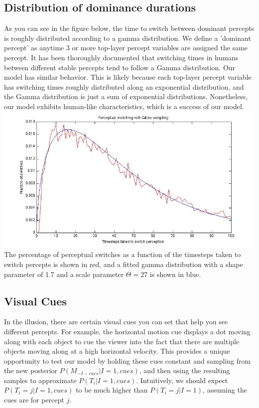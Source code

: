 \documentclass{article} %
\begin{document}


\subsection{Distribution of dominance durations}
As you can see in the figure below, the time to switch between dominant percepts is roughly distributed according to a gamma distribution. We define a 'dominant percept' as anytime 3 or more top-layer percept variables are assigned the same percept. It has been thoroughly documented that switching times in humans between different stable percepts tend to follow a Gamma distribution. Our model has similar behavior. This is likely because each top-layer percept variable has switching times roughly distributed along an exponential distribution, and the Gamma distribution is just a sum of exponential distributions. Nonetheless, our model exhibits human-like characteristics, which is a success of our model. \\

\includegraphics[scale=0.51]{sickbrah}
\small
The percentage of perceptual switches as a function of the timesteps taken to switch percepts is shown in red, and a fitted gamma distribution with a shape parameter of 1.7 and a scale parameter $\Theta = 27$ is shown in blue.
\normalsize


\subsection{Visual Cues}
In the illusion, there are certain visual cues you can set that help you see different percepts. For example, the horizontal motion cue displays a dot moving along with each object to cue the viewer into the fact that there are multiple objects moving along at a high horizontal velocity. This provides a unique opportunity to test our model by holding these cues constant and sampling from the new posterior $P(M_{-I-cues}|I=1, cues)$, and then using the resulting samples to approximate $P(T_i|I=1, cues)$. Intuitively, we should expect $P(T_i = j|I=1, cues)$ to be much higher than $P(T_i = j|I=1)$, assuming the cues are for percept $j$. 
\end{document}
